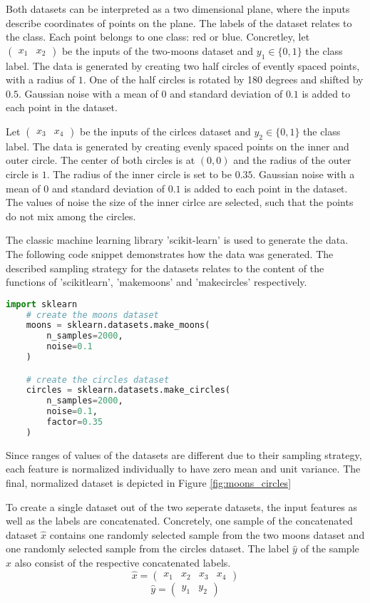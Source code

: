 Both datasets can be interpreted as a two dimensional plane, where the inputs describe coordinates of points on the plane. 
The labels of the dataset relates to the class.
Each point belongs to one class: red or blue.
Concretley, let $\begin{pmatrix} x_1 & x_2 \end{pmatrix}$ be the inputs of the two-moons dataset and $y_1 \in \{0,1\}$ the class label.
The data is generated by creating two half circles of evently spaced points, with a radius of $1$.
One of the half circles is rotated by 180 degrees and shifted by $0.5$.
Gaussian noise with a mean of $0$ and standard deviation of $0.1$ is added to each point in the dataset.

Let $\begin{pmatrix} x_3 & x_4 \end{pmatrix}$ be the inputs of the cirlces dataset and $y_2 \in \{0,1\}$ the class label.
The data is generated by creating evenly spaced points on the inner and outer circle. 
The center of both circles is at $(0,0)$ and the radius of the outer circle is $1$.
The radius of the inner circle is set to be $0.35$.
Gaussian noise with a mean of $0$ and standard deviation of $0.1$ is added to each point in the dataset.
The values of noise the size of the inner cirlce are selected, such that the points do not mix among the circles.

The classic machine learning library 'scikit-learn' is used to generate the data. 
The following code snippet demonstrates how the data was generated.
The described sampling strategy for the datasets relates to the content of the functions of 'scikitlearn', 'makemoons' and 'makecircles' respectively.

\begin{lstlisting}[language=Python]
    import sklearn
    # create the moons dataset
    moons = sklearn.datasets.make_moons(
        n_samples=2000, 
        noise=0.1
    )

    # create the circles dataset
    circles = sklearn.datasets.make_circles(
        n_samples=2000, 
        noise=0.1, 
        factor=0.35
    )
\end{lstlisting}

Since ranges of values of the datasets are different due to their sampling strategy, each feature is normalized individually to have zero mean and unit variance.
The final, normalized dataset is depicted in Figure \ref{fig:moons_circles}

To create a single dataset out of the two seperate datasets, the input features as well as the labels are concatenated.
Concretely, one sample of the concatenated dataset $\hat x$ contains one randomly selected sample from the two moons dataset and one randomly selected sample from the circles dataset.
The label $\hat y$ of the sample $\hat x$ also consist of the respective concatenated labels.
$$\hat x = \begin{pmatrix} x_1 & x_2 & x_3 & x_4 \end{pmatrix}$$
$$\hat y = \begin{pmatrix} y_1 & y_2 \end{pmatrix}$$

